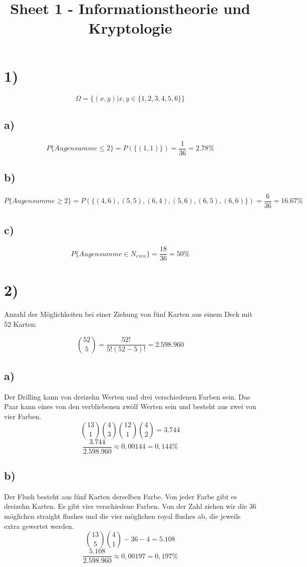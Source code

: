 \documentclass{article}
\begin{document}
  \title{Sheet 1 - Informationstheorie und Kryptologie}
  \date{}
  \author{}

  \maketitle

\section*{1)}
  \[ \Omega = \{(x,y) |x,y \in \{ 1,2,3,4,5,6 \} \} \]

  \subsection*{a)}
    \[ P \{ Augensumme \leq 2 \} = P(\{ (1,1)\} ) = \frac{1}{36} = 2.78 \% \]

  \subsection*{b)}
    \[ P \{ Augensumme \geq 2 \} = P(\{ (4,6), (5,5), (6,4), (5,6), (6,5), (6,6)\} ) = \frac{6}{36} = 16.67 \% \]

  \subsection*{c)}
    \[ P \{ Augensumme \in N_{even} \} = \frac{18}{36} = 50 \% \]

\section*{2)}
  Anzahl der Möglichkeiten bei einer Ziehung von fünf Karten aus einem Deck mit 52 Karten:

  \[ \binom{52}{5} = \frac{52!}{5!(52-5)!} = 2.598.960 \]

  \subsection*{a)}
    Der Drilling kann von dreizehn Werten und drei verschiedenen Farben sein. Das Paar kann eines von den verbliebenen zwölf Werten sein und besteht aus zwei von vier Farben.
    \[ \binom{13}{1}\binom{4}{3}\binom{12}{1}\binom{4}{2} = 3.744 \]
    \[ \frac{3.744}{2.598.960} \approx 0,00144 = 0,144 \% \]

  \subsection*{b)}
    Der Flush besteht aus fünf Karten derselben Farbe. Von jeder Farbe gibt es dreizehn Karten. Es gibt vier verschiedene Farben. Von der Zahl ziehen wir die 36 möglichen straight flushes und die vier möglichen royal flushes ab, die jeweils extra gewertet werden.
    \[ \binom{13}{5}\binom{4}{1} - 36 - 4 = 5.108 \]
    \[ \frac{5.108}{2.598.960} \approx 0,00197 = 0,197 \% \]
\end{document}
